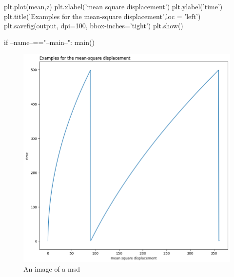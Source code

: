 \documentclass[12pt, a4paper, twoside]{report}
\begin{document}
\hspace*{10mm}    plt.plot(mean,z)\newline
\hspace*{10mm}    plt.xlabel('mean square displacement')\newline
\hspace*{10mm}    plt.ylabel('time')\newline\newline
\hspace*{10mm}   plt.title('Examples for the mean-square displacement',loc = 'left')\newline
\hspace*{10mm}    plt.savefig(output, dpi=100, bbox-inches='tight')\newline
\hspace*{10mm}    plt.show()\newline

if --name--=="--main--":\newline
\hspace*{10mm}    main()

\begin{figure}[htp]
    \centering
    \includegraphics[width=15cm]{msd.png}
    \caption{An image of a msd}
    \label{fig:msd}
\end{figure}
\end{document}
